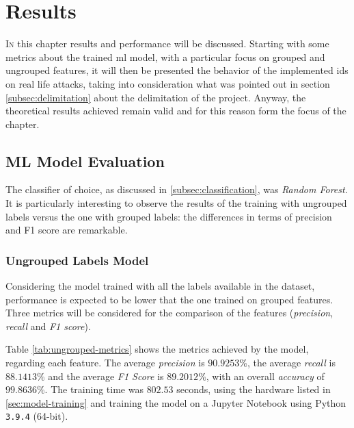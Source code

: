 \chapter{Results}
\label{chap:results}

\lettrine[lines=4, findent=3pt, nindent=0pt]{I}{n} this chapter results and performance will be discussed. Starting with some metrics about the trained \gls{ml} model, with a particular focus on grouped and ungrouped features, it will then be presented the behavior of the implemented \gls{ids} on real life attacks, taking into consideration what was pointed out in section \ref{subsec:delimitation} about the delimitation of the project. Anyway, the theoretical results achieved remain valid and for this reason form the focus of the chapter.

\section{ML Model Evaluation}
\label{sec:ml-model-evaluation}

The classifier of choice, as discussed in \ref{subsec:classification}, was \textit{Random Forest}. It is particularly interesting to observe the results of the training with ungrouped labels versus the one with grouped labels: the differences in terms of precision and F1 score are remarkable.


\subsection{Ungrouped Labels Model}
\label{subsec:ungrouped-training}

Considering the model trained with all the labels available in the dataset, performance is expected to be lower that the one trained on grouped features. Three metrics will be considered for the comparison of the features (\textit{precision}, \textit{recall} and \textit{F1 score}).
\par Table \ref{tab:ungrouped-metrics} shows the metrics achieved by the model, regarding each feature. The average \textit{precision} is $90.9253\%$, the average \textit{recall} is $88.1413\%$ and the average \textit{F1 Score} is $89.2012\%$, with an overall \textit{accuracy} of $99.8636\%$. The training time was $802.53$ seconds, using the hardware listed in \ref{sec:model-training} and training the model on a Jupyter Notebook using Python \texttt{3.9.4} (64-bit).

